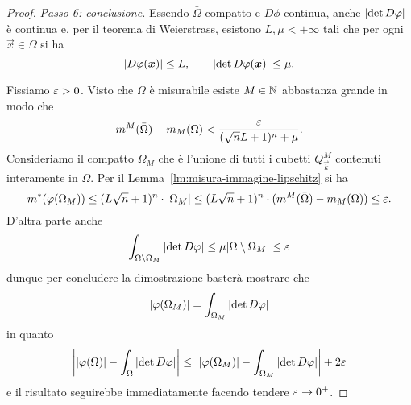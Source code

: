 \begin{proof}
\emph{Passo 6: conclusione.}
Essendo $\bar \Omega$ compatto e $D\phi$ continua, 
anche ${\left|\det D\varphi\right|}$ è continua e, per il teorema di Weierstrass,
esistono $L,\mu<+\infty$ tali che per ogni $\vec x \in \bar \Omega$ si ha
\[
  {\left|D\varphi(\boldsymbol x)\right|} \le L,
  \qquad
  {\left|\det D\varphi(\boldsymbol x)\right|} \le \mu.
\]

Fissiamo $\varepsilon>0$.
Visto che $\Omega$ è misurabile esiste $M\in {\mathbb N}$ abbastanza grande in modo che 
\[
  m^M(\bar \Omega)-m_M(\Omega) < \frac{\varepsilon}{(\sqrt n L +1)^n + \mu}.
\]
Consideriamo il compatto $\Omega_M$ che è l'unione di tutti i cubetti $Q^M_{\vec k}$
contenuti interamente in $\Omega$.
Per il Lemma~\ref{lm:misura-immagine-lipschitz} si ha 
\[
 m^*(\varphi(\Omega_M)) 
 \le (L\sqrt n + 1)^n \cdot {\left|\Omega_M\right|} 
 \le (L\sqrt n + 1)^n \cdot (m^M(\bar \Omega) - m_M(\Omega))
 \le \varepsilon.
\]
D'altra parte anche 
\[
\int_{\Omega\setminus \Omega_M} {\left|\det D\varphi\right|}
\le \mu {\left|\Omega\setminus \Omega_M\right|} \le \varepsilon
\]
dunque per concludere la dimostrazione basterà mostrare che 
\begin{equation}\label{eq:39254}
  {\left|\varphi(\Omega_M)\right|} = \int_{\Omega_M} {\left|\det D\varphi\right|} 
\end{equation}
in quanto 
\[
   {\left|{\left|\varphi(\Omega)\right|} - \int_{\Omega} {\left|\det D\varphi\right|}\right|}
   \le {\left|{\left|\varphi(\Omega_M)\right|} - \int_{\Omega_M} {\left|\det D\varphi\right|}\right|} + 2\varepsilon
\]
e il risultato seguirebbe immediatamente facendo tendere $\varepsilon\to 0^+$.


\end{proof}
